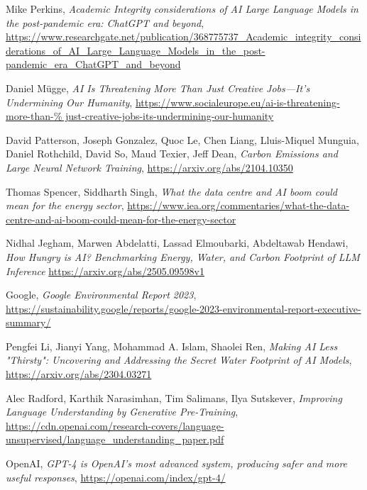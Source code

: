 \begin{thebibliography}{9}

	Mike Perkins,
	\textit{Academic Integrity considerations of AI Large Language Models in the post-pandemic era: ChatGPT and beyond},
	\url{https://www.researchgate.net/publication/368775737_Academic_integrity_considerations_of_AI_Large_Language_Models_in_the_post-pandemic_era_ChatGPT_and_beyond}

	Daniel Mügge,
	\textit{AI Is Threatening More Than Just Creative Jobs—It’s Undermining Our Humanity},
	\url{https://www.socialeurope.eu/ai-is-threatening-more-than-%
	just-creative-jobs-its-undermining-our-humanity}

	David Patterson, Joseph Gonzalez, Quoc Le, Chen Liang, Lluis-Miquel Munguia, Daniel Rothchild, David So, Maud Texier, Jeff Dean,
	\textit{Carbon Emissions and Large Neural Network Training},
	\url{https://arxiv.org/abs/2104.10350}

	Thomas Spencer, Siddharth Singh,
	\textit{What the data centre and AI boom could mean for the energy sector},
	\url{https://www.iea.org/commentaries/what-the-data-centre-and-ai-boom-could-mean-for-the-energy-sector}

	Nidhal Jegham, Marwen Abdelatti, Lassad Elmoubarki, Abdeltawab Hendawi,
	\textit{How Hungry is AI? Benchmarking Energy, Water, and Carbon Footprint of LLM Inference}
	\url{https://arxiv.org/abs/2505.09598v1}

	Google,
	\textit{Google Environmental Report 2023},
	\url{https://sustainability.google/reports/google-2023-environmental-report-executive-summary/}

	Pengfei Li, Jianyi Yang, Mohammad A. Islam, Shaolei Ren,
	\textit{Making AI Less "Thirsty": Uncovering and Addressing the Secret Water Footprint of AI Models},
	\url{https://arxiv.org/abs/2304.03271}

	Alec Radford, Karthik Narasimhan, Tim Salimans, Ilya Sutskever,
	\textit{Improving Language Understanding by Generative Pre-Training},
	\url{https://cdn.openai.com/research-covers/language-unsupervised/language_understanding_paper.pdf}

	OpenAI,
	\textit{GPT-4 is OpenAI’s most advanced system, producing safer and more useful responses},
	\url{https://openai.com/index/gpt-4/}


\end{thebibliography}
